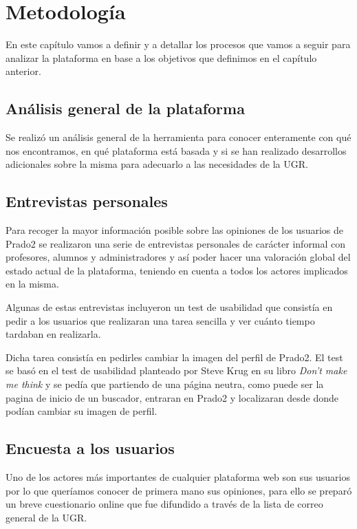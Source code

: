 \chapter{Metodología}

En este capítulo vamos a definir y a detallar los procesos que vamos a seguir para analizar la plataforma en base a los objetivos que definimos en el capítulo anterior.

\section{Análisis general de la plataforma}
Se realizó un análisis general de la herramienta para conocer enteramente con qué nos encontramos, en qué plataforma está basada y si se han realizado desarrollos adicionales sobre la misma para adecuarlo a las necesidades de la UGR.

\section{Entrevistas personales}

Para recoger la mayor información posible sobre las opiniones de los usuarios de Prado2 se realizaron una serie de entrevistas personales de carácter informal con profesores, alumnos y administradores y así poder hacer una valoración global del estado actual de la plataforma, teniendo en cuenta a todos los actores implicados en la misma.

\bigskip
Algunas de estas entrevistas incluyeron un test de usabilidad que consistía en pedir a los usuarios que realizaran una tarea sencilla y ver cuánto tiempo tardaban en realizarla.

\bigskip
Dicha tarea consistía en pedirles cambiar la imagen del perfil de Prado2. El test se basó en el test de usabilidad planteado por Steve Krug en su libro \textit{Don't make me think} \cite{stevekrug} y se pedía que partiendo de una página neutra, como puede ser la pagina de inicio de un buscador, entraran en Prado2 y localizaran desde donde podían cambiar su imagen de perfil.


\section{Encuesta a los usuarios}
Uno de los actores más importantes de cualquier plataforma web son sus usuarios por lo que queríamos conocer de primera mano sus opiniones, para ello se preparó un breve cuestionario online que fue difundido a través de la lista de correo general de la UGR.

